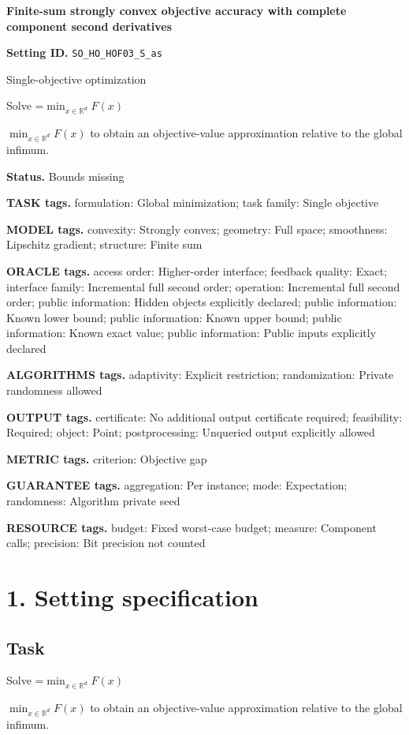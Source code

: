 \documentclass[10pt,a4paper]{article}
\newcommand{\AtlasMath}[1]{\par\begingroup\centering\setbox0=\hbox{$\displaystyle #1$}\ifdim\wd0>1.4\linewidth\typeout{ATLAS WIDE FORMULA: \the\wd0}\fi\ifdim\wd0>\linewidth\resizebox{\linewidth}{!}{\box0}\else\box0\fi\par\endgroup}
\newcommand{\AtlasInlineMath}[1]{\begingroup\setbox0=\hbox{$#1$}\ifdim\wd0>.4\linewidth\endgroup\AtlasMath{#1}\else\endgroup$#1$\fi}
\begin{document}
\raggedright

{\LARGE\bfseries\sffamily\color{AtlasNavy} Finite-sum strongly convex objective accuracy with complete component second derivatives\par}\vspace{5pt}
\textbf{Setting ID.} \texttt{SO\_\allowbreak{}HO\_\allowbreak{}HOF03\_\allowbreak{}S\_\allowbreak{}as}

Single-objective optimization

Solve \AtlasInlineMath{\min_{x\in \mathbb{R}^d}F(x)} to obtain an objective-value approximation relative to the global infimum.

\textbf{Status.} Bounds missing

\textbf{TASK tags.} formulation: Global minimization; task family: Single objective

\textbf{MODEL tags.} convexity: Strongly convex; geometry: Full space; smoothness: Lipschitz gradient; structure: Finite sum

\textbf{ORACLE tags.} access order: Higher-order interface; feedback quality: Exact; interface family: Incremental full second order; operation: Incremental full second order; public information: Hidden objects explicitly declared; public information: Known lower bound; public information: Known upper bound; public information: Known exact value; public information: Public inputs explicitly declared

\textbf{ALGORITHMS tags.} adaptivity: Explicit restriction; randomization: Private randomness allowed

\textbf{OUTPUT tags.} certificate: No additional output certificate required; feasibility: Required; object: Point; postprocessing: Unqueried output explicitly allowed

\textbf{METRIC tags.} criterion: Objective gap

\textbf{GUARANTEE tags.} aggregation: Per instance; mode: Expectation; randomness: Algorithm private seed

\textbf{RESOURCE tags.} budget: Fixed worst-case budget; measure: Component calls; precision: Bit precision not counted

\section{1. Setting specification}
\subsection{Task}
Solve \AtlasInlineMath{\min_{x\in \mathbb{R}^d}F(x)} to obtain an objective-value approximation relative to the global infimum.
\end{document}
